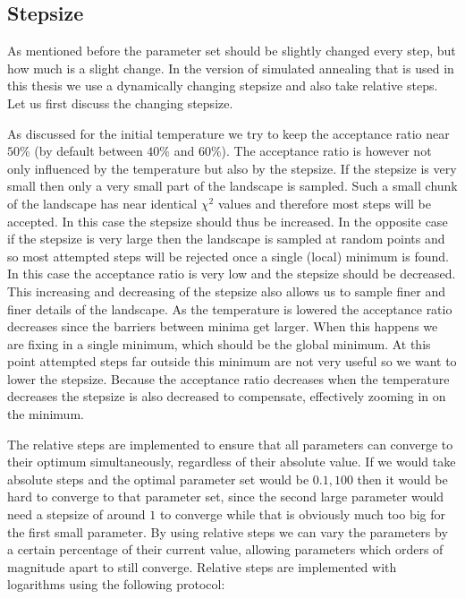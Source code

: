 \subsection{Stepsize}

As mentioned before the parameter set should be slightly changed every step, but how much is a slight change. In the version of simulated annealing that is used in this thesis we use a dynamically changing stepsize and also take relative steps. Let us first discuss the changing stepsize.

As discussed for the initial temperature we try to keep the acceptance ratio near $50\%$ (by default between $40\%$ and $60\%$). The acceptance ratio is however not only influenced by the temperature but also by the stepsize. If the stepsize is very small then only a very small part of the landscape is sampled. Such a small chunk of the landscape has near identical $\chi^2$ values and therefore most steps will be accepted. In this case the stepsize should thus be increased. In the opposite case if the stepsize is very large then the landscape is sampled at random points and so most attempted steps will be rejected once a single (local) minimum is found. In this case the acceptance ratio is very low and the stepsize should be decreased. This increasing and decreasing of the stepsize also allows us to sample finer and finer details of the landscape. As the temperature is lowered the acceptance ratio decreases since the barriers between minima get larger. When this happens we are fixing in a single minimum, which should be the global minimum. At this point attempted steps far outside this minimum are not very useful so we want to lower the stepsize. Because the acceptance ratio decreases when the temperature decreases the stepsize is also decreased to compensate, effectively zooming in on the minimum.

The relative steps are implemented to ensure that all parameters can converge to their optimum simultaneously, regardless of their absolute value. If we would take absolute steps and the optimal parameter set would be ${0.1,100}$ then it would be hard to converge to that parameter set, since the second large parameter would need a stepsize of around $1$ to converge while that is obviously much too big for the first small parameter. By using relative steps we can vary the parameters by a certain percentage of their current value, allowing parameters which orders of magnitude apart to still converge. Relative steps are implemented with logarithms using the following protocol:

